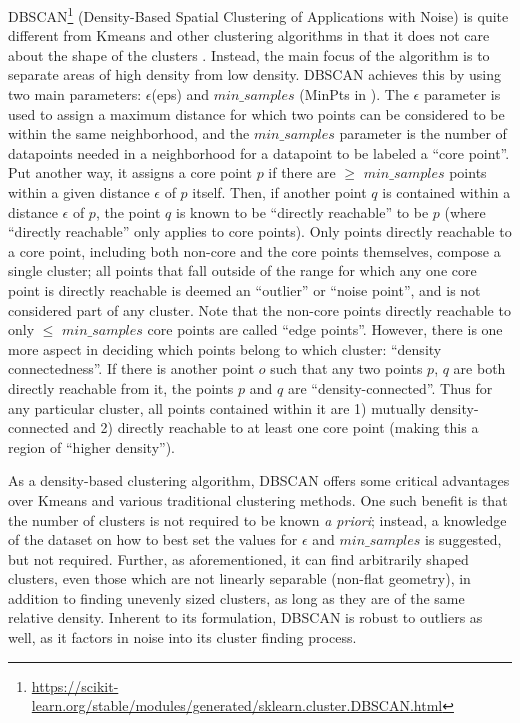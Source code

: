 \documentclass[fleqn,usenatbib,useAMS]{mnras}
\begin{document}
DBSCAN\footnote{\url{https://scikit-learn.org/stable/modules/generated/sklearn.cluster.DBSCAN.html}} (Density-Based Spatial Clustering of Applications with Noise) is quite different from Kmeans and other clustering algorithms in that it does not care about the shape of the clusters \citep{Ester96}. Instead, the main focus of the algorithm is to separate areas of high density from low density. DBSCAN achieves this by using two main parameters: $\epsilon$(eps) and $min\_samples$ (MinPts in \cite{Ester96}). The $\epsilon$ parameter is used to assign a maximum distance for which two points can be considered to be within the same neighborhood, and the $min\_samples$ parameter is the number of datapoints needed in a neighborhood for a datapoint to be labeled a ``core point''. Put another way, it assigns a core point $p$ if there are $\geq$ $min\_samples$ points within a given distance $\epsilon$ of $p$ itself. Then, if another point $q$ is contained within a distance $\epsilon$ of $p$, the point $q$ is known to be ``directly reachable'' to be $p$ (where ``directly reachable'' only applies to core points). Only points directly reachable to a core point, including both non-core and the core points themselves, compose a single cluster; all points that fall outside of the range for which any one core point is directly reachable is deemed an ``outlier'' or ``noise point'', and is not considered part of any cluster. Note that the non-core points directly reachable to only $\leq$ $min\_samples$ core points are called ``edge points''. However, there is one more aspect in deciding which points belong to which cluster: ``density connectedness''. If there is another point $o$ such that any two points $p$, $q$ are both directly reachable from it, the points $p$ and $q$ are ``density-connected''. Thus for any particular cluster, all points contained within it are 1) mutually density-connected and 2) directly reachable to at least one core point (making this a region of ``higher density''). \par

As a density-based clustering algorithm, DBSCAN offers some critical advantages over Kmeans and various traditional clustering methods. One such benefit is that the number of clusters is not required to be known \textit{a priori}; instead, a knowledge of the dataset on how to best set the values for $\epsilon$ and $min\_samples$ is suggested, but not required. Further, as aforementioned, it can find arbitrarily shaped clusters, even those which are not linearly separable (non-flat geometry), in addition to finding unevenly sized clusters, as long as they are of the same relative density. Inherent to its formulation, DBSCAN is robust to outliers as well, as it factors in noise into its cluster finding process. \par
\end{document}
